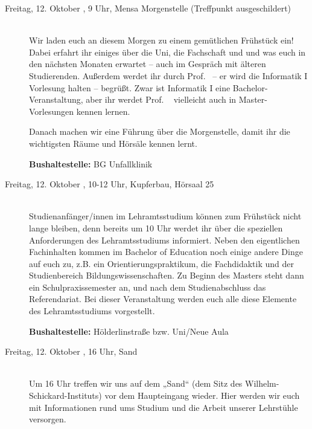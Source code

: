 \begin{description}
\item[Freitag, 12. Oktober \Jahr, 9 Uhr, Mensa Morgenstelle (Treffpunkt ausgeschildert)]\ \\
Wir laden euch an diesem Morgen zu einem gemütlichen Frühstück ein! Dabei erfahrt ihr einiges über die Uni, die Fachschaft und und was euch in den nächsten Monaten erwartet -- auch im Gespräch mit älteren
Studierenden. Außerdem werdet ihr durch Prof. \Infoprof~-- er wird die Informatik I Vorlesung halten -- begrüßt.
\ifmaster Zwar ist Informatik I eine Bachelor-Veranstaltung, aber ihr werdet Prof. \Infoprof~ vielleicht auch in Master-Vorlesungen kennen lernen. \fi 

Danach machen wir eine Führung über die Morgenstelle, damit ihr die wichtigsten Räume und Hörsäle kennen lernt. 

\textbf{Bushaltestelle:} BG Unfallklinik

\iflehramt
\item[Freitag, 12. Oktober \Jahr, 10-12 Uhr, Kupferbau, Hörsaal 25]\ \\
Studienanfänger/innen im Lehramtsstudium können zum Frühstück nicht lange bleiben, denn bereits um 10 Uhr werdet ihr über die speziellen 
Anforderungen des Lehramtsstudiums informiert. Neben den eigentlichen Fachinhalten kommen im 
Bachelor of Education noch einige andere Dinge auf euch zu, z.B. ein Orientierungspraktikum, die 
Fachdidaktik und der Studienbereich Bildungswissenschaften. Zu Beginn des Masters steht dann 
ein Schulpraxissemester an, und nach dem Studienabschluss das Referendariat. Bei dieser Veranstaltung werden euch 
alle diese Elemente des Lehramtsstudiums vorgestellt.

\textbf{Bushaltestelle:} Hölderlinstraße bzw. Uni/Neue Aula
\fi


\item[Freitag, 12. Oktober \Jahr, 16 Uhr, Sand]\ \\
Um 16 Uhr treffen wir uns auf dem „Sand“ (dem Sitz des Wilhelm-Schickard-Instituts) vor dem Haupteingang
wieder. Hier werden wir euch mit Informationen rund ums Studium und die Arbeit unserer Lehrstühle versorgen.


\end{description}
